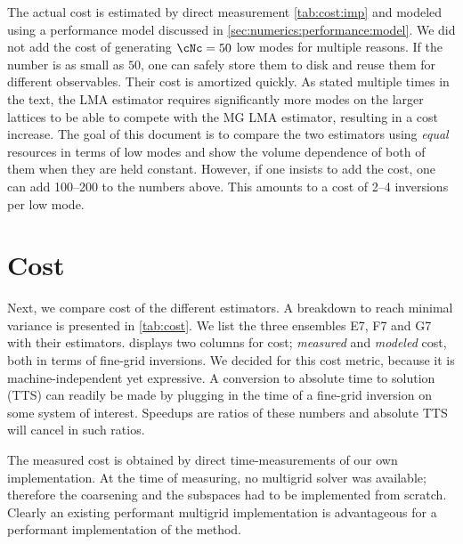 \begin{table}[b!]
\begin{threeparttable}
{The actual cost is estimated by direct measurement \cref{tab:cost:imp} and modeled using a performance model discussed in \cref{sec:numerics:performance:model}.
We did not add the cost of generating $\cNc=50$ low modes for multiple reasons. If the number is as small as $50$, one can safely store them to disk and reuse them for different observables.
Their cost is amortized quickly.
As stated multiple times in the text, the LMA estimator requires significantly more modes on the larger lattices to be able to compete with the MG LMA estimator, resulting in a cost increase.
The goal of this document is to compare the two estimators using \emph{equal} resources in terms of low modes and show the volume dependence of both of them when they are held constant.
However, if one insists to add the cost, one can add \numrange{100}{200} to the numbers above.
This amounts to a cost of \numrange{2}{4} inversions per low mode.
}
\end{threeparttable}
\end{table}

\section{Cost}
\label{sec:cost}

Next, we compare cost of the different estimators.
A breakdown to reach minimal variance is presented in \cref{tab:cost}.
We list the three ensembles E7, F7 and G7 with their estimators.
 displays two columns for cost; \emph{measured} and \emph{modeled} cost, both in terms of fine-grid inversions.
We decided for this cost metric, because it is machine-independent yet expressive.
A conversion to absolute time to solution (TTS) can readily be made by plugging in the time of a fine-grid inversion on some system of interest.
Speedups are ratios of these numbers and absolute TTS will cancel in such ratios.

The measured cost is obtained by direct time-measurements of our own implementation.
At the time of measuring, no multigrid solver was available; therefore the coarsening and the subspaces had to be implemented from scratch.
Clearly an existing performant multigrid implementation is advantageous for a performant implementation of the method.

